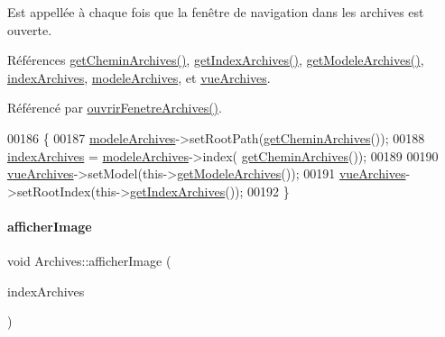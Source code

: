 Est appellée à chaque fois que la fenêtre de navigation dans les archives est ouverte. 

Références \hyperlink{class_archives_a65dfbaba0123e6530b03bfb70e614c90}{get\+Chemin\+Archives()}, \hyperlink{class_archives_a3df83e6dd301afe331d7e75bd1b84a57}{get\+Index\+Archives()}, \hyperlink{class_archives_ab5a55ac2e810cfdec3ce19af14087ceb}{get\+Modele\+Archives()}, \hyperlink{class_archives_a31cba52f3979585ee5e2b9390d21322b}{index\+Archives}, \hyperlink{class_archives_a61376e4ec330aea053fede230a1bc786}{modele\+Archives}, et \hyperlink{class_archives_a28fe566dcac396079d064460b17293b9}{vue\+Archives}.



Référencé par \hyperlink{class_archives_a14d4f834ea05cf421161336607b4bb31}{ouvrir\+Fenetre\+Archives()}.


\begin{DoxyCode}
00186 \{
00187     \hyperlink{class_archives_a61376e4ec330aea053fede230a1bc786}{modeleArchives}->setRootPath(\hyperlink{class_archives_a65dfbaba0123e6530b03bfb70e614c90}{getCheminArchives}());
00188     \hyperlink{class_archives_a31cba52f3979585ee5e2b9390d21322b}{indexArchives} = \hyperlink{class_archives_a61376e4ec330aea053fede230a1bc786}{modeleArchives}->index(
      \hyperlink{class_archives_a65dfbaba0123e6530b03bfb70e614c90}{getCheminArchives}());
00189 
00190     \hyperlink{class_archives_a28fe566dcac396079d064460b17293b9}{vueArchives}->setModel(this->\hyperlink{class_archives_ab5a55ac2e810cfdec3ce19af14087ceb}{getModeleArchives}());
00191     \hyperlink{class_archives_a28fe566dcac396079d064460b17293b9}{vueArchives}->setRootIndex(this->\hyperlink{class_archives_a3df83e6dd301afe331d7e75bd1b84a57}{getIndexArchives}());
00192 \}
\end{DoxyCode}
\mbox{\label{class_archives_a0e12a12774643d96831be4daba73976e}} 
\paragraph{\texorpdfstring{afficher\+Image}{afficherImage}}
{\footnotesize\ttfamily void Archives\+::afficher\+Image (\begin{DoxyParamCaption}\item[{const Q\+Model\+Index \&}]{index\+Archives }\end{DoxyParamCaption})\hspace{0.3cm}{\ttfamily [slot]}}


